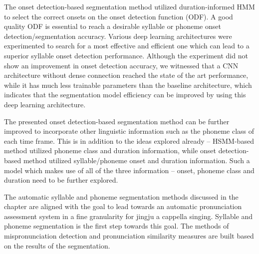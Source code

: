 The onset detection-based segmentation method utilized duration-informed HMM to select the correct onsets on the onset detection function (ODF). A good quality ODF is essential to reach a desirable syllable or phoneme onset detection/segmentation accuracy. Various deep learning architectures were experimented to search for a most effective and efficient one which can lead to a superior syllable onset detection performance. Although the experiment did not show an improvement in onset detection accuracy, we witnessed that a CNN architecture without dense connection reached the state of the art performance, while it has much less trainable parameters than the baseline architecture, which indicates that the segmentation model efficiency can be improved by using this deep learning architecture.

The presented onset detection-based segmentation method can be further improved to incorporate other linguistic information such as the phoneme class of each time frame. This is in addition to the ideas explored already -- HSMM-based method utilized phoneme class and duration information, while onset detection-based method utilized syllable/phoneme onset and duration information. Such a model which makes use of all of the three information -- onset, phoneme class and duration need to be further explored.

The automatic syllable and phoneme segmentation methods discussed in the chapter are aligned with the goal to lead towards an automatic pronunciation assessment system in a fine granularity for jingju a cappella singing. Syllable and phoneme segmentation is the first step towards this goal. The methods of mispronunciation detection and pronunciation similarity measures are built based on the results of the segmentation.
